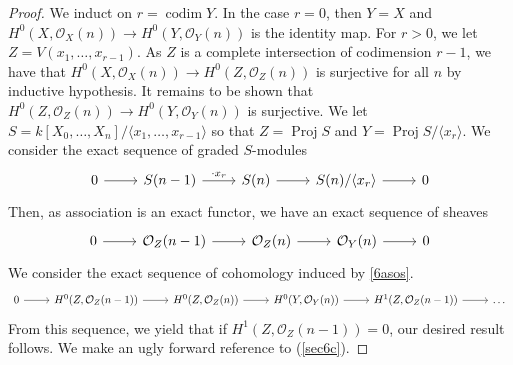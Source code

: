 \documentclass[english,letter,doublesided]{article}
\newcommand{\OO}{\mathcal{O}}
\theoremstyle{remark}
\theoremstyle{definition}
\newcommand{\idl}[1]{\langle #1 \rangle}
\DeclareMathOperator{\codim}{codim}
\DeclareMathOperator{\proj}{Proj}
\begin{document}
\begin{proof}
	We induct on $r=\codim Y$. In the case $r=0$, then $Y=X$ and  $H^0(X,\OO_X(n))\to H^0(Y,\OO_Y(n))$ is the identity map. For $r>0$, we let $Z=V({x_1,\dots,x_{r-1}})$. As $Z$ is a complete intersection of codimension $r-1$, we have that $H^0(X,\OO_X(n))\to H^0(Z,\OO_Z(n))$ is surjective for all $n$ by inductive hypothesis. It remains to be shown that $H^0(Z,\OO_Z(n)) \to H^0(Y,\OO_Y(n))$ is surjective. We let $S=k[X_0,\dots,X_n]/\idl{x_1,\dots,x_{r-1}}$ so that $Z=\proj S$ and $Y=\proj S/\idl{x_r}$. We consider the exact sequence of graded $S$-modules
	\begin{equation}
		\begin{tikzcd}
		0\arrow[r]&S(n-1)\arrow[r,"\cdot x_r"]&S(n)\arrow[r]&S(n)/\idl{x_r}\arrow[r]& 0
		\end{tikzcd}
	\end{equation}
	Then, as association is an exact functor, we have an exact sequence of sheaves
	\begin{equation}
	\begin{tikzcd}
	0\arrow[r]&\OO_Z(n-1)\arrow[r]&\OO_Z(n)\arrow[r]&\OO_Y(n)\arrow[r]&0\label{6asos}
	\end{tikzcd}
		\end{equation}
We consider the exact sequence of cohomology induced by \eqref{6asos}. 
\begin{equation}
		\begin{tikzcd}
	0\arrow[r]&H^0(Z,\OO_Z(n-1))\arrow[r]&H^0(Z,\OO_Z(n))\arrow[r]&H^0(Y,\OO_Y(n))\arrow[r]&H^1(Z,\OO_Z(n-1))\arrow[r]&\dots\label{6asoch}
	\end{tikzcd}
\end{equation}
From this sequence, we yield that if $H^1(Z,\OO_Z(n-1))=0$, our desired result follows. We make an ugly forward reference to (\ref{sec6c}).
\end{proof}
\end{document}

